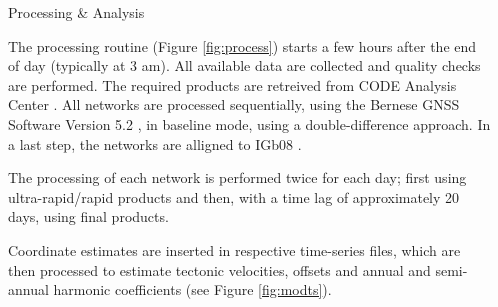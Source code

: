 \documentclass[final,a0,portrait]{beamer}
\newlength{\sepwid}
\newlength{\onecolwid}
\begin{document}
\begin{frame}[t]
\begin{columns}[t]

\begin{column}{\sepwid}\end{column} %

\begin{column}{\onecolwid} %


\begin{block}{Processing \& Analysis}

{\small
The processing routine (Figure \ref{fig:process}) starts a few hours after the end of day (typically at 3 am). All available data are collected and quality 
checks are performed. The required products are retreived from CODE Analysis Center \cite{codeac}.
All networks are processed sequentially, using the Bernese GNSS Software Version 5.2 \cite{bernese}, in baseline mode, 
using a double-difference approach. In a last step, the networks are alligned to IGb08 \cite{igb08}.

The processing of each network is performed twice for each day; first using ultra-rapid/rapid products and then, with a time 
lag of approximately 20 days, using final products. 

Coordinate estimates are inserted in respective time-series files, which are then processed to estimate tectonic velocities, 
offsets and annual and semi-annual harmonic coefficients (see Figure \ref{fig:modts}).

}
\end{block}
\end{column}
\end{columns}
\end{frame}
\end{document}
